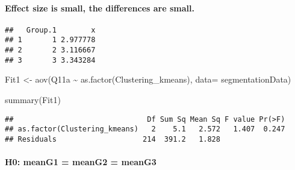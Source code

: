 \documentclass[
]{article}
\newenvironment{Shaded}{\begin{snugshade}}{\end{snugshade}}
\newcommand{\AttributeTok}[1]{\textcolor[rgb]{0.77,0.63,0.00}{#1}}
\newcommand{\FunctionTok}[1]{\textcolor[rgb]{0.00,0.00,0.00}{#1}}
\newcommand{\NormalTok}[1]{#1}
\newcommand{\OtherTok}[1]{\textcolor[rgb]{0.56,0.35,0.01}{#1}}
\newcommand{\SpecialCharTok}[1]{\textcolor[rgb]{0.00,0.00,0.00}{#1}}
\newcommand{\StringTok}[1]{\textcolor[rgb]{0.31,0.60,0.02}{#1}}
\begin{document}
\hypertarget{effect-size-is-small-the-differences-are-small.}{%
\paragraph{Effect size is small, the differences are
small.}\label{effect-size-is-small-the-differences-are-small.}}

\begin{Shaded}
\end{Shaded}

\begin{verbatim}
##   Group.1        x
## 1       1 2.977778
## 2       2 3.116667
## 3       3 3.343284
\end{verbatim}

\begin{Shaded}
\begin{Highlighting}[]
\NormalTok{Fit1 }\OtherTok{\textless{}{-}} \FunctionTok{aov}\NormalTok{(Q11a }\SpecialCharTok{\textasciitilde{}} \FunctionTok{as.factor}\NormalTok{(Clustering\_kmeans), }\AttributeTok{data=}\NormalTok{ segmentationData)}

\FunctionTok{summary}\NormalTok{(Fit1)}
\end{Highlighting}
\end{Shaded}

\begin{verbatim}
##                               Df Sum Sq Mean Sq F value Pr(>F)
## as.factor(Clustering_kmeans)   2    5.1   2.572   1.407  0.247
## Residuals                    214  391.2   1.828
\end{verbatim}

\hypertarget{h0-meang1-meang2-meang3-1}{%
\paragraph{H0: meanG1 = meanG2 =
meanG3}\label{h0-meang1-meang2-meang3-1}}
\end{document}
